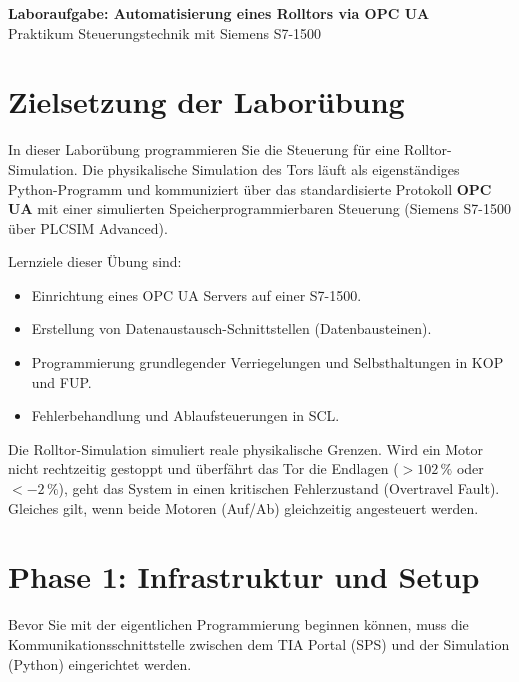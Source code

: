 \documentclass[11pt,a4paper]{article}
\begin{document}
\begin{center}
    \vspace*{1cm}
    \Huge \textbf{Laboraufgabe: Automatisierung eines Rolltors via OPC UA} \\[0.5cm]
    \Large Praktikum Steuerungstechnik mit Siemens S7-1500 \\[1.5cm]
\end{center}

\section*{Zielsetzung der Laborübung}
In dieser Laborübung programmieren Sie die Steuerung für eine Rolltor-Simulation. Die physikalische Simulation des Tors läuft als eigenständiges Python-Programm und kommuniziert über das standardisierte Protokoll \textbf{OPC UA} mit einer simulierten Speicherprogrammierbaren Steuerung (Siemens S7-1500 über PLCSIM Advanced). 

Lernziele dieser Übung sind:
\begin{itemize}[noitemsep]
    \item Einrichtung eines OPC UA Servers auf einer S7-1500.
    \item Erstellung von Datenaustausch-Schnittstellen (Datenbausteinen).
    \item Programmierung grundlegender Verriegelungen und Selbsthaltungen in KOP und FUP.
    \item Fehlerbehandlung und Ablaufsteuerungen in SCL.
\end{itemize}

\vspace{0.5cm}
\begin{tcolorbox}[colback=warningred!10, colframe=warningred, title=\textbf{Wichtiger Hinweis zur Simulation}]
Die Rolltor-Simulation simuliert reale physikalische Grenzen. Wird ein Motor nicht rechtzeitig gestoppt und überfährt das Tor die Endlagen ($> 102\,\%$ oder $< -2\,\%$), geht das System in einen kritischen Fehlerzustand (Overtravel Fault). Gleiches gilt, wenn beide Motoren (Auf/Ab) gleichzeitig angesteuert werden.
\end{tcolorbox}

\newpage

\section{Phase 1: Infrastruktur und Setup}

Bevor Sie mit der eigentlichen Programmierung beginnen können, muss die Kommunikationsschnittstelle zwischen dem TIA Portal (SPS) und der Simulation (Python) eingerichtet werden.
\end{document}
